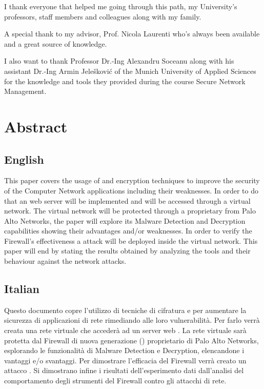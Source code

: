 I thank everyone that helped me going through this path, my University's professors, staff members and colleagues along with my family.

A special thank to my advisor, Prof. Nicola Laurenti who's always been available and a great source of knowledge.

I also want to thank Professor Dr.-Ing Alexandru Soceanu along with his assistant Dr.-Ing Armin Jelešković of the Munich University of Applied Sciences for the knowledge and tools they provided during the  course Secure Network Management.


\tableofcontents

\newpage

\chapter*{Abstract}


\section*{English}

This paper covers the usage of  and  encryption techniques to improve the security of the Computer Network applications including their weaknesses. In order to do that an  web server will be implemented and will be accessed through a virtual network.
The virtual network will be protected through a proprietary  from Palo Alto Networks, the paper will explore its Malware Detection and  Decryption capabilities showing their advantages and/or weaknesses.
In order to verify the Firewall's effectiveness a  attack will be deployed inside the virtual network.
This paper will end by stating the results obtained by analyzing the  tools and their behaviour against the network attacks.

\section*{Italian}

Questo documento copre l'utilizzo di tecniche di cifratura  e  per aumentare la sicurezza di applicazioni di rete rimediando alle loro vulnerabilit\`a.
Per farlo verr\`a creata una rete virtuale che acceder\`a ad un server web .
La rete virtuale sar\`a protetta dal Firewall di nuova generazione () proprietario di Palo Alto Networks, esplorando le funzionalit\`a di Malware Detection e  Decryption, elencandone i vantaggi e/o svantaggi.
Per dimostrare l'efficacia del Firewall verr\`a creato un attacco .
Si dimostrano infine i risultati dell'esperimento dati dall'analisi del comportamento degli strumenti del Firewall contro gli attacchi di rete.

